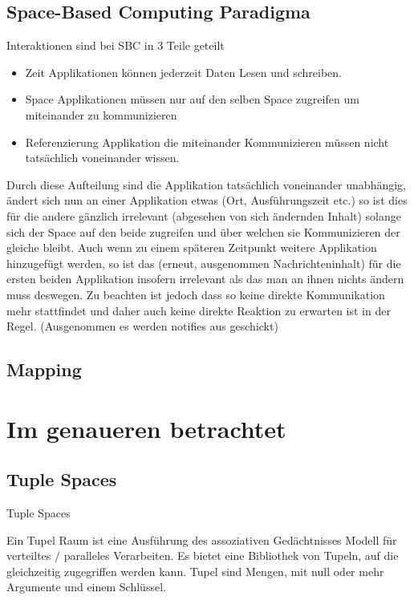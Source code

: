 \documentclass[a4paper,12pt]{scrreprt}
\begin{document}
	\section{Space-Based Computing Paradigma}
		Interaktionen sind bei SBC in 3 Teile geteilt 
		\begin{itemize}
			\item Zeit
				\subitem Applikationen können jederzeit Daten Lesen und schreiben.
			\item Space
				\subitem Applikationen müssen nur auf den selben Space zugreifen um miteinander zu kommunizieren
			\item Referenzierung
				\subitem Applikation die miteinander Kommunizieren müssen nicht tatsächlich voneinander wissen.
		\end{itemize}
		Durch diese Aufteilung sind die Applikation tatsächlich voneinander unabhängig, ändert sich nun an einer Applikation etwas (Ort, Ausführungszeit etc.) so ist dies für die andere gänzlich irrelevant (abgesehen von sich ändernden Inhalt) solange sich der Space auf den beide zugreifen und über welchen sie Kommunizieren der gleiche bleibt. Auch wenn zu einem späteren Zeitpunkt weitere Applikation hinzugefügt werden, so ist das (erneut, ausgenommen Nachrichteninhalt) für die ersten beiden Applikation insofern irrelevant als das man an ihnen nichts ändern muss deswegen. Zu beachten ist jedoch dass so keine direkte Kommunikation mehr stattfindet und daher auch keine direkte Reaktion zu erwarten ist in der Regel. (Ausgenommen es werden notifies aus geschickt)
		
		
		
	\section{Mapping}
		
	
\chapter{Im genaueren betrachtet}
	\section{Tuple Spaces}
		Tuple Spaces
		
		Ein Tupel Raum ist eine Ausführung des assoziativen Gedächtnisses Modell für verteiltes / paralleles Verarbeiten. Es bietet eine Bibliothek von Tupeln, auf  die gleichzeitig zugegriffen werden kann. Tupel sind Mengen, mit null oder mehr Argumente und einem Schlüssel. 
		
\end{document}

